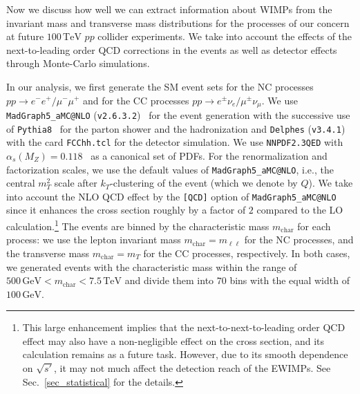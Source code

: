 \documentclass[12pt,twoside,book]{article}
\begin{document}
Now we discuss how well we can extract information about WIMPs from the invariant mass and transverse mass distributions for the processes of our concern at future $100\,\mathrm{TeV}$ $pp$ collider experiments.
We take into account the effects of the next-to-leading order QCD corrections in the events as well as detector effects through Monte-Carlo simulations.

In our analysis, we first generate the SM event sets for the NC processes $pp\to e^{-}e^{+} / \mu^{-}\mu^{+}$ and for the CC processes $pp\to e^{\pm}\nu_e / \mu^{\pm}\nu_\mu$.
We use \texttt{MadGraph5\_aMC@NLO} (\texttt{v2.6.3.2})~\cite{Alwall:2011uj, Alwall:2014hca} for the event generation with the successive use of \texttt{Pythia8}~\cite{Sjostrand:2014zea} for the parton shower and the hadronization and \texttt{Delphes} (\texttt{v3.4.1})~\cite{deFavereau:2013fsa} with the card {\tt FCChh.tcl} for the detector simulation.
We use \texttt{NNPDF2.3QED} with $\alpha_s (M_Z) = 0.118$~\cite{Ball:2013hta} as a canonical set of PDFs.
For the renormalization and factorization scales, we use the default values of \texttt{MadGraph5\_aMC@NLO}, i.e., the central $m_T^2$ scale after $k_T$-clustering of the event (which we denote by $Q$).
We take into account the NLO QCD effect by the \verb|[QCD]| option of \verb|MadGraph5_aMC@NLO| since it enhances the cross section roughly by a factor of $2$ compared to the LO calculation.\footnote
{
  This large enhancement implies that the next-to-next-to-leading order QCD effect may also have a non-negligible effect on the cross section, and its calculation remains as a future task.
  However, due to its smooth dependence on $\sqrt{s'}$, it may not much affect the detection reach of the EWIMPs.
  See Sec.~\ref{sec_statistical} for the details.
}
The events are binned by the characteristic mass $m_{\mathrm{char}}$ for each process: we use the lepton invariant mass $m_{\mathrm{char}} = m_{\ell\ell}$ for the NC processes, and the transverse mass $m_{\mathrm{char}} = m_T$ for the CC processes, respectively.
In both cases, we generated events with the characteristic mass within the range of $500\,\mathrm{GeV} < m_\mathrm{char} < 7.5\,\mathrm{TeV}$ and divide them into $70$ bins with the equal width of $100\,\mathrm{GeV}$.
\end{document}
